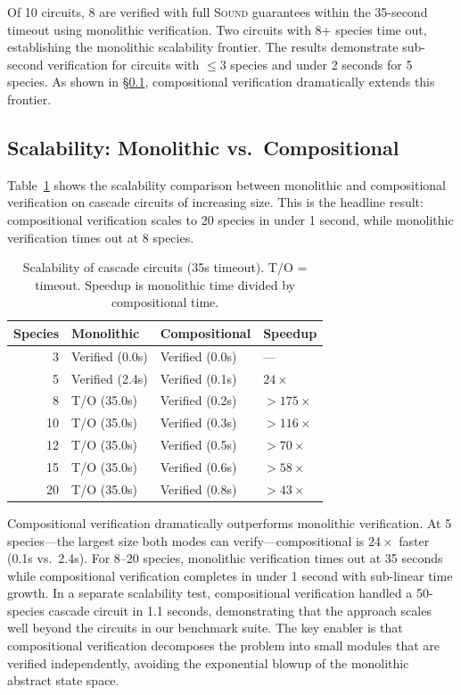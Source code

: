 \documentclass[11pt]{article}
\begin{document}
Of 10 circuits, 8 are verified with full \textsc{Sound} guarantees
within the 35-second timeout using monolithic verification. Two
circuits with 8+ species time out, establishing the monolithic
scalability frontier. The results demonstrate sub-second verification
for circuits with $\leq 3$ species and under 2 seconds for 5 species.
As shown in \S\ref{sec:scalability}, compositional verification
dramatically extends this frontier.

\subsection{Scalability: Monolithic vs.\ Compositional}
\label{sec:scalability}

Table~\ref{tab:scalability} shows the scalability comparison between
monolithic and compositional verification on cascade circuits of
increasing size. This is the headline result: compositional
verification scales to 20 species in under 1 second, while monolithic
verification times out at 8 species.

\begin{table}[t]
\centering
\caption{Scalability of cascade circuits (35s timeout). T/O = timeout.
  Speedup is monolithic time divided by compositional time.}
\label{tab:scalability}
\small
\begin{tabular}{rlll}
\toprule
\textbf{Species} & \textbf{Monolithic} & \textbf{Compositional} & \textbf{Speedup} \\
\midrule
 3 & Verified (0.0s)  & Verified (0.0s) & --- \\
 5 & Verified (2.4s)  & Verified (0.1s) & $24\times$ \\
 8 & T/O (35.0s)      & Verified (0.2s) & $>175\times$ \\
10 & T/O (35.0s)      & Verified (0.3s) & $>116\times$ \\
12 & T/O (35.0s)      & Verified (0.5s) & $>70\times$ \\
15 & T/O (35.0s)      & Verified (0.6s) & $>58\times$ \\
20 & T/O (35.0s)      & Verified (0.8s) & $>43\times$ \\
\bottomrule
\end{tabular}
\end{table}

Compositional verification dramatically outperforms monolithic
verification. At 5 species---the largest size both modes can
verify---compositional is $24\times$ faster (0.1s vs.\ 2.4s). For
8--20 species, monolithic verification times out at 35 seconds
while compositional verification completes in under 1 second with
sub-linear time growth. In a separate scalability test, compositional
verification handled a 50-species cascade circuit in 1.1 seconds,
demonstrating that the approach scales well beyond the circuits
in our benchmark suite. The key enabler is that compositional
verification decomposes the problem into small modules that are
verified independently, avoiding the exponential blowup of the
monolithic abstract state space.
\end{document}
